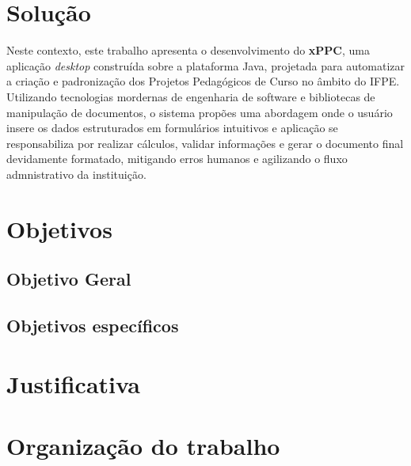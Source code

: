 \section{Solução}
Neste contexto, este trabalho apresenta o desenvolvimento do \textbf{xPPC}, uma aplicação \textit{desktop} construída sobre a plataforma Java, projetada para automatizar a criação e padronização dos Projetos Pedagógicos de Curso no âmbito do IFPE. Utilizando tecnologias mordernas de engenharia de software e bibliotecas de manipulação de documentos, o sistema propões uma abordagem onde o usuário insere os dados estruturados em formulários intuitivos e aplicação se responsabiliza por realizar cálculos, validar informações e gerar o documento final devidamente formatado, mitigando erros humanos e agilizando o fluxo admnistrativo da instituição. 

\section{Objetivos}
\subsection{Objetivo Geral}
\subsection{Objetivos específicos}

\section{Justificativa}
\section{Organização do trabalho}